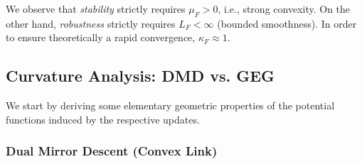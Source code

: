 \documentclass[10pt]{amsart}
\theoremstyle{definition}
\theoremstyle{definition}	 %
\begin{document}
 We observe that   \textit{stability} strictly requires $\mu_F > 0$, i.e., strong convexity. On the other hand,    \textit{robustness} strictly requires $L_F < \infty$ (bounded smoothness). In order to ensure theoretically a rapid convergence,  $\kappa_F \approx 1$.

\subsection{Curvature Analysis: DMD vs. GEG}
\label{sec:curvature}

We start by deriving some elementary geometric properties of the potential functions induced by the respective updates.

\subsubsection{Dual Mirror Descent (Convex Link)}
\end{document}
